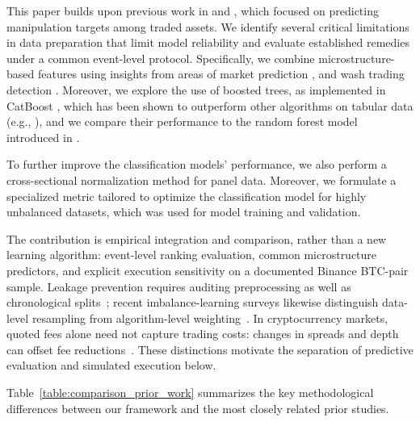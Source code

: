\documentclass{ieeeaccess}
\begin{document}
This paper builds upon previous work in \cite{pd_anatomy} and \cite{hu2023sequence}, which focused on predicting manipulation targets among traded assets. We identify several critical limitations in data preparation that limit model reliability and evaluate established remedies under a common event-level protocol. Specifically, we combine microstructure-based features using insights from areas of market prediction \cite{albers_frag_2022}, \cite{ntakaris_midprice_2022} and wash trading detection \cite{cong_washtrading_2023}. Moreover, we explore the use of boosted trees, as implemented in CatBoost \cite{catboost}, which has been shown to outperform other algorithms on tabular data (e.g., \cite{grinsztajn_2022}), and we compare their performance to the random forest model introduced in \cite{random_forest_2001}.

To further improve the classification models' performance, we also perform a cross-sectional normalization method for panel data. Moreover, we formulate a specialized metric tailored to optimize the classification model for highly unbalanced datasets, which was used for model training and validation.

The contribution is empirical integration and comparison, rather than a new learning algorithm: event-level ranking evaluation, common microstructure predictors, and explicit execution sensitivity on a documented Binance BTC-pair sample. Leakage prevention requires auditing preprocessing as well as chronological splits~\cite{kapoor2023leakage,cerqueira2020evaluation}; recent imbalance-learning surveys likewise distinguish data-level resampling from algorithm-level weighting~\cite{chen2024imbalance}. In cryptocurrency markets, quoted fees alone need not capture trading costs: changes in spreads and depth can offset fee reductions~\cite{galati2024fees}. These distinctions motivate the separation of predictive evaluation and simulated execution below.

Table~\ref{table:comparison_prior_work} summarizes the key methodological differences between our framework and the most closely related prior studies.
\end{document}
